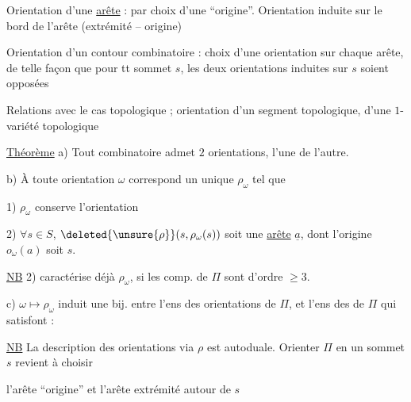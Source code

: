 Orientation d'une \uline{arête} : par choix d'une ``origine''.
Orientation induite sur le bord de l'arête (extrémité -- origine)

Orientation d'un contour combinatoire : choix d'une orientation sur chaque arête, de telle façon que pour tt sommet $s$, les deux orientations induites sur $s$ soient opposées
\diagram{\begin{tikzcd}[ampersand replacement=\&,row sep=.2em,column sep=2em]
{} \arrow[dr] \& \& {}\\
\& \bullet \arrow[ur] \&
\end{tikzcd}}

 Relations avec le cas topologique ; orientation d'un segment topologique, d'une $1$-variété topologique

\uline{Théorème} a) Tout \uline{} combinatoire admet  $2$ orientations,   l'une de l'autre.

b) À toute orientation $\omega$  correspond un unique  $\rho_\omega$ tel que

1) $\rho_\omega$ conserve l'orientation

2) $\forall s\in S$, $\deleted{\unsure{\rho}}(s,\rho_\omega(s))$ soit une \uline{arête} $\underline a$, dont l'origine $o_\omega(a)$ soit $s$.


\uline{NB} 2) caractérise déjà $\rho_\omega$, si les comp. de $\Pi$ sont d'ordre $\geq3$.

 c) $\omega\mapsto\rho_\omega$ induit une bij. entre l'ens des orientations de $\Pi$, et l'ens des  de $\Pi$ qui satisfont :

\uline{NB} La description des orientations via $\rho$ est autoduale. Orienter $\Pi$ en un sommet $s$ revient à choisir

l'arête ``origine'' et l'arête extrémité autour de $s$
